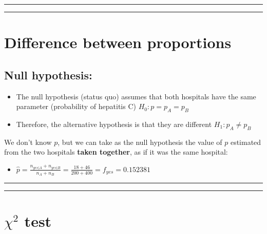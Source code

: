 \documentclass[
]{book}
\providecommand{\tightlist}{%
  \setlength{\itemsep}{0pt}\setlength{\parskip}{0pt}}
\begin{document}
\begin{center}\rule{0.5\linewidth}{0.5pt}\end{center}

\begin{center}\rule{0.5\linewidth}{0.5pt}\end{center}

\hypertarget{difference-between-proportions-4}{%
\section{Difference between proportions}\label{difference-between-proportions-4}}

\hypertarget{null-hypothesis-2}{%
\subsection{Null hypothesis:}\label{null-hypothesis-2}}

\begin{itemize}
\item
  The null hypothesis (status quo) assumes that both hospitals have the same parameter (probability of hepatitis C) \(H_0: p=p_A=p_B\)
\item
  Therefore, the alternative hypothesis is that they are different \(H_1: p_A\neq p_B\)
\end{itemize}

We don't know \(p\), but we can take as the null hypothesis the value of \(p\) estimated from the two hospitals \textbf{taken together}, as if it was the same hospital:

\begin{itemize}
\tightlist
\item
  \(\hat{p}=\frac{n_{yes|A}+n_{yes|B}}{n_A+n_B}=\frac{18+46}{200+400}= f_{yes}=0.152381\)
\end{itemize}

\begin{center}\rule{0.5\linewidth}{0.5pt}\end{center}

\begin{center}\rule{0.5\linewidth}{0.5pt}\end{center}

\hypertarget{chi2-test}{%
\section{\texorpdfstring{\(\chi^2\) test}{\textbackslash chi\^{}2 test}}\label{chi2-test}}
\end{document}
